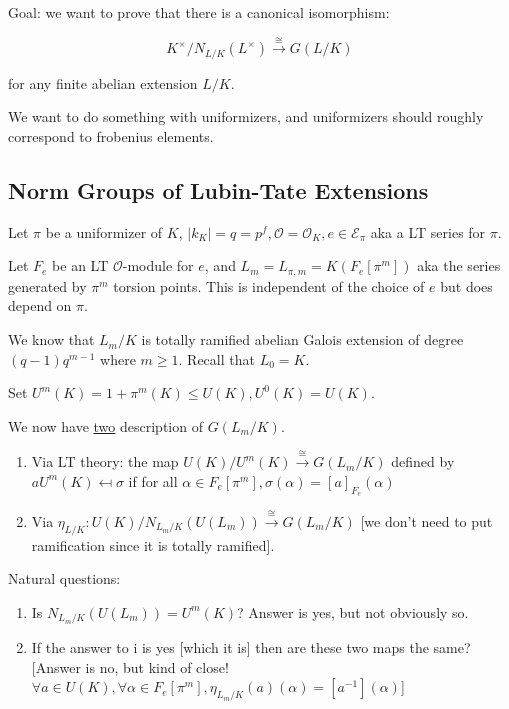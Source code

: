 \documentclass{article}
\theoremstyle{definition}
\numberwithin{theorem}{subsection}
\begin{document}
    Goal: we want to prove that there is a canonical isomorphism:

    \[
        K^\times / N_{L / K} (L^ \times) \xrightarrow{\cong} G(L / K)
    \]

    for any finite abelian extension \(L / K\).

    We want to do something with uniformizers, and uniformizers should roughly correspond to frobenius elements.

    \subsection*{Norm Groups of Lubin-Tate Extensions}

    Let \(\pi\) be a uniformizer of \(K\), \(\vert k_K \vert = q = p^f, \mathcal{O} = \mathcal{O}_K, e \in \mathscr{E}_\pi\) aka a LT series for \(\pi\).

    Let \(F_e\) be an LT \(\mathcal{O}\)-module for \(e\), and \(L_m = L_{\pi, m} = K(F_e[\pi^m])\) aka the series generated by \(\pi^m\) torsion points. This is independent of the choice of \(e\) but does depend on \(\pi\).

    We know that \(L_m / K\) is totally ramified abelian Galois extension of degree \((q-1)q^{m-1}\) where \(m \geq 1\). Recall that \(L_0 = K\).

    Set \(U^m(K) = 1 + \pi^m(K) \leq U(K), U^0(K) = U(K)\).

    We now have \underline{two} description of \(G(L_m / K)\).

    \begin{enumerate}[label=\arabic*)]
        \item Via LT theory: the map \(U(K) / U^m(K) \xrightarrow{\cong} G(L_m / K)\) defined by \(a U^m(K) \mapsfrom \sigma\) if for all \(\alpha \in F_e[\pi^m], \sigma(\alpha) = [a]_{F_e}(\alpha)\)
        
        \item Via \(\eta_{L / K}: U(K) / N_{L_m / K}(U(L_m)) \xrightarrow{\cong} G(L_m / K)\) [we don't need to put ramification since it is totally ramified].
    \end{enumerate} 

    Natural questions:

    \begin{enumerate}[label=\roman*)]
        \item Is \(N_{L_m / K}(U(L_m)) = U^m(K)\)? Answer is yes, but not obviously so.
        \item If the answer to i is yes [which it is] then are these two maps the same? [Answer is no, but kind of close! \(\forall a\in U(K), \forall \alpha \in F_e[\pi^m], \eta_{L_m / K}(a) (\alpha) = [a ^{-1}](\alpha)\)]
    \end{enumerate} 
\end{document}
